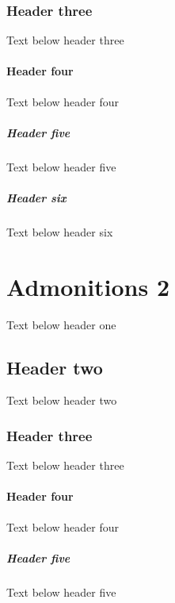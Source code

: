 \documentclass[a4paper,10pt,icelandic]{sphinxmanual}
\begin{document}
\subsubsection{Header three}
\label{\detokenize{admonitions/admonitions-1/index:header-three}}
\sphinxAtStartPar
Text below header three


\paragraph{Header four}
\label{\detokenize{admonitions/admonitions-1/index:header-four}}
\sphinxAtStartPar
Text below header four


\subparagraph{Header five}
\label{\detokenize{admonitions/admonitions-1/index:header-five}}
\sphinxAtStartPar
Text below header five


\subparagraph{Header six}
\label{\detokenize{admonitions/admonitions-1/index:header-six}}
\sphinxAtStartPar
Text below header six

\sphinxstepscope


\section{Admonitions 2}
\label{\detokenize{admonitions/admonitions-2/index:admonitions-2}}\label{\detokenize{admonitions/admonitions-2/index::doc}}
\sphinxAtStartPar
Text below header one


\subsection{Header two}
\label{\detokenize{admonitions/admonitions-2/index:header-two}}
\sphinxAtStartPar
Text below header two


\subsubsection{Header three}
\label{\detokenize{admonitions/admonitions-2/index:header-three}}
\sphinxAtStartPar
Text below header three


\paragraph{Header four}
\label{\detokenize{admonitions/admonitions-2/index:header-four}}
\sphinxAtStartPar
Text below header four


\subparagraph{Header five}
\label{\detokenize{admonitions/admonitions-2/index:header-five}}
\sphinxAtStartPar
Text below header five
\end{document}

